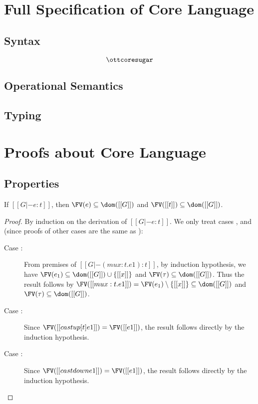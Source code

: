 \section{Full Specification of Core Language}

\subsection{Syntax}
\gram{\otte\ottinterrule
        \ottG\ottinterrule
        \ottv}
\[\ottcoresugar\] %

\subsection{Operational Semantics}
\ottdefnstep{}
\ottusedrule{\ottdruleSXXMu{}}

\subsection{Typing}
\ottdefnctx{}\ottinterrule
\ottdefnexpr{}
\ottusedrule{\ottdruleTXXMu{}}

\section{Proofs about Core Language}
\subsection{Properties}
\begin{lem}\label{lem:appendix:free}
    If $[[G |- e:t]]$, then $\FV(e) \subseteq \dom([[G]])$ and $\FV([[t]])
\subseteq \dom([[G]])$.
\end{lem}

\begin{proof}
    By induction on the derivation of $[[G |- e:t]]$. We only treat cases
,  and  (since proofs of
other cases are the same as \cc \cite{handbook}):
    \begin{description}
        \item[Case :] From premises of $[[G |- (mu x:t.e1) :
t]]$, by induction hypothesis, we have $\FV(e_1) \subseteq \dom([[G]]) \cup
\{[[x]]\}$ and $\FV(\tau) \subseteq \dom([[G]])$. Thus the result follows by
$\FV([[mu x:t.e1]])=\FV(e_1) \setminus \{[[x]]\} \subseteq \dom([[G]])$ and
$\FV(\tau) \subseteq \dom([[G]])$.
        \item[Case :] Since $\FV([[castup [t]
e1]])=\FV([[e1]])$, the result follows directly by the induction hypothesis.
        \item[Case :] Since $\FV([[castdown
e1]])=\FV([[e1]])$, the result follows directly by the induction hypothesis.
    \end{description}
\end{proof}

